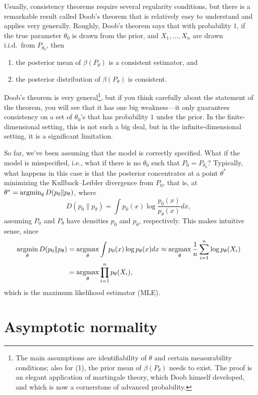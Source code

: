\documentclass[12pt]{article}
\begin{document}
Usually, consistency theorems require several regularity conditions, but there is a remarkable result called Doob's theorem that is relatively easy to understand and applies very generally. Roughly, Doob's theorem says that with probability $1$, if the true parameter $\theta_0$ is drawn from the prior, and $X_1,\ldots,X_n$ are drawn i.i.d.\ from $P_{\theta_0}$, then
\begin{enumerate}
\item the posterior mean of $\beta(P_\theta)$ is a consistent estimator, and
\item the posterior distribution of $\beta(P_\theta)$ is consistent.
\end{enumerate}
Doob's theorem is very general\footnote{The main assumptions are identifiability of $\theta$ and certain measurability conditions; also for (1), the prior mean of $\beta(P_\theta)$ needs to exist. The proof is an elegant application of martingale theory, which Doob himself developed, and which is now a cornerstone of advanced probability.}, but if you think carefully about the statement of the theorem, you will see that it has one big weakness---it only guarantees consistency on a set of $\theta_0$'s that has probability $1$ under the prior. In the finite-dimensional setting, this is not such a big deal, but in the infinite-dimensional setting, it is a significant limitation.

So far, we've been assuming that the model is correctly specified. What if the model is misspecified, i.e., what if there is no $\theta_0$ such that $P_0 = P_{\theta_0}$? Typically, what happens in this case is that the posterior concentrates at a point $\theta^*$ minimizing the Kullback--Leibler divergence from $P_0$, that is, at $\theta^*= \operatorname*{argmin}_{\theta} D(p_0 \| p_\theta)$, where
$$ D(p_0 \| p_\theta) = \int p_0(x) \log \frac{p_0(x)}{p_\theta(x)} d x, $$
assuming $P_0$ and $P_\theta$ have densities $p_0$ and $p_\theta$, respectively. This makes intuitive sense, since
\begin{align*}
\operatorname*{argmin}_\theta D(p_0 \| p_\theta) &= \operatorname*{argmax}_\theta \int p_0(x) \log p_\theta(x)d x \approx \operatorname*{argmax}_\theta \frac{1}{n}\sum_{i = 1}^n \log p_\theta(X_i) \\
& = \operatorname*{argmax}_\theta \prod_{i = 1}^n p_\theta(X_i),
\end{align*}
which is the maximum likelihood estimator (MLE).




\section{Asymptotic normality}
\end{document}
